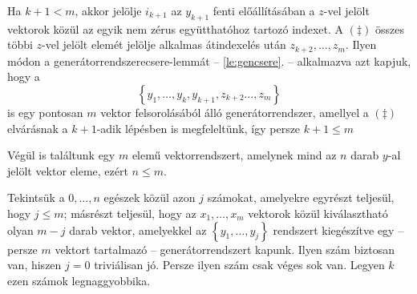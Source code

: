 \documentclass[a4paper, showtrims]{memoir}
\makeatletter
\renewenvironment{proof}[1][\proofname]
    {\par\pushQED{\qed}%
    \normalfont \topsep6\p@\@plus6\p@\relax
    \trivlist
    \item[\hskip\labelsep
        \itshape
    #1\@addpunct{:}]\ignorespaces}
    {\popQED\endtrivlist\@endpefalse}
\theoremstyle{plain}
\theoremstyle{remark}
\theoremstyle{definition}
\makeatother
\begin{document}
\begin{proof}
    Ha $k+1<m$, akkor
    jelölje $i_{k+1}$ az $y_{k+1}$ fenti előállításában a $z$-vel jelölt vektorok közül az egyik nem zérus együtthatóhoz tartozó indexet.
    A $(\ddag)$ összes többi $z$-vel jelölt elemét jelölje alkalmas átindexelés után $z_{k+2},\ldots,z_{m}$.
    Ilyen módon a generátorrendszerecsere-lemmát -- \ref{le:gencsere}. -- alkalmazva azt kapjuk, hogy a
    \[
        \left\{ y_1,\dots,y_k,y_{k+1},z_{k+2}\ldots, z_m \right\}
    \]
    is egy pontosan $m$ vektor felsorolásából álló generátorrendszer, 
    amellyel a $(\ddag)$ elvárásnak a $k+1$-adik lépésben is megfeleltünk, így persze $k+1 \leq m$
    
    Végül is találtunk egy $m$ elemű vektorrendszert, amelynek
    mind az $n$ darab $y$-al jelölt vektor eleme, ezért $n\leq m$.
\end{proof}
\begin{proof}
    Tekintsük a $0,\ldots,n$ egészek közül azon $j$ számokat,
    amelyekre egyrészt teljesül, hogy $j\leq m$; 
    másrészt teljesül, 
    hogy az $x_1,\dots,x_m$ vektorok közül kiválasztható olyan $m-j$ darab vektor,
    amelyekkel az $\left\{y_1,\ldots,y_j \right\}$ rendszert kiegészítve egy 
    -- persze $m$ vektort tartalmazó --
    generátorrendszert kapunk.
	Ilyen szám biztosan van, hiszen $j=0$ triviálisan jó. Persze ilyen szám csak véges sok van.
	Legyen $k$ ezen számok legnaggyobbika.


\end{proof}
\end{document}
